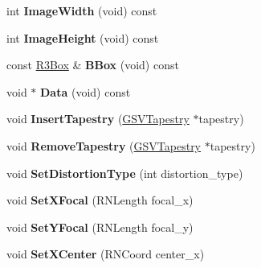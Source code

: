 \begin{DoxyCompactItemize}
\item 
int {\bfseries Image\+Width} (void) const \hypertarget{class_g_s_v_camera_a70250380ecdfe2936f364a407934d24b}{}\label{class_g_s_v_camera_a70250380ecdfe2936f364a407934d24b}

\item 
int {\bfseries Image\+Height} (void) const \hypertarget{class_g_s_v_camera_a037830f58a215eccd845d00b0efeddc0}{}\label{class_g_s_v_camera_a037830f58a215eccd845d00b0efeddc0}

\item 
const \hyperlink{class_r3_box}{R3\+Box} \& {\bfseries B\+Box} (void) const \hypertarget{class_g_s_v_camera_a474ce7b2d95a0058bef845e5c83bff32}{}\label{class_g_s_v_camera_a474ce7b2d95a0058bef845e5c83bff32}

\item 
void $\ast$ {\bfseries Data} (void) const \hypertarget{class_g_s_v_camera_a9f24b625c8dd39753e70d36c218c96bc}{}\label{class_g_s_v_camera_a9f24b625c8dd39753e70d36c218c96bc}

\item 
void {\bfseries Insert\+Tapestry} (\hyperlink{class_g_s_v_tapestry}{G\+S\+V\+Tapestry} $\ast$tapestry)\hypertarget{class_g_s_v_camera_a4401fa868a459fcdacd373bfa56d1fc2}{}\label{class_g_s_v_camera_a4401fa868a459fcdacd373bfa56d1fc2}

\item 
void {\bfseries Remove\+Tapestry} (\hyperlink{class_g_s_v_tapestry}{G\+S\+V\+Tapestry} $\ast$tapestry)\hypertarget{class_g_s_v_camera_ace59901400d69ee12d30c55701ac72d6}{}\label{class_g_s_v_camera_ace59901400d69ee12d30c55701ac72d6}

\item 
void {\bfseries Set\+Distortion\+Type} (int distortion\+\_\+type)\hypertarget{class_g_s_v_camera_a970385d599deb38b2a2ec415e6b860ef}{}\label{class_g_s_v_camera_a970385d599deb38b2a2ec415e6b860ef}

\item 
void {\bfseries Set\+X\+Focal} (R\+N\+Length focal\+\_\+x)\hypertarget{class_g_s_v_camera_a6aef5fc3c5eee0c86291e016baf49dc2}{}\label{class_g_s_v_camera_a6aef5fc3c5eee0c86291e016baf49dc2}

\item 
void {\bfseries Set\+Y\+Focal} (R\+N\+Length focal\+\_\+y)\hypertarget{class_g_s_v_camera_afea036efac842046617febd33b6cc40f}{}\label{class_g_s_v_camera_afea036efac842046617febd33b6cc40f}

\item 
void {\bfseries Set\+X\+Center} (R\+N\+Coord center\+\_\+x)\hypertarget{class_g_s_v_camera_a12879efc324706f741e1afb50ed93447}{}\label{class_g_s_v_camera_a12879efc324706f741e1afb50ed93447}


\end{DoxyCompactItemize}

